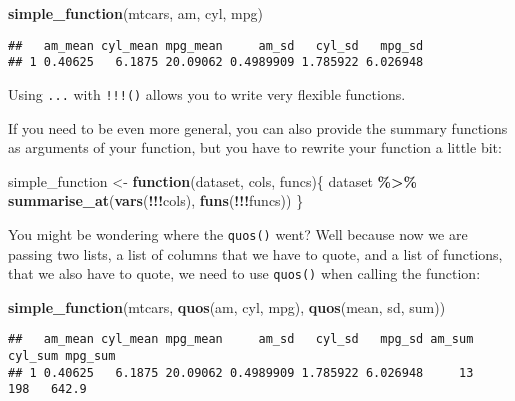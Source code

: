 \documentclass[
]{article}
\newenvironment{Shaded}{\begin{snugshade}}{\end{snugshade}}
\newcommand{\ControlFlowTok}[1]{\textcolor[rgb]{0.13,0.29,0.53}{\textbf{#1}}}
\newcommand{\KeywordTok}[1]{\textcolor[rgb]{0.13,0.29,0.53}{\textbf{#1}}}
\newcommand{\NormalTok}[1]{#1}
\newcommand{\OperatorTok}[1]{\textcolor[rgb]{0.81,0.36,0.00}{\textbf{#1}}}
\newcommand{\StringTok}[1]{\textcolor[rgb]{0.31,0.60,0.02}{#1}}
\begin{document}
\begin{Shaded}
\begin{Highlighting}[]
\KeywordTok{simple\_function}\NormalTok{(mtcars, am, cyl, mpg)}
\end{Highlighting}
\end{Shaded}

\begin{verbatim}
##   am_mean cyl_mean mpg_mean     am_sd   cyl_sd   mpg_sd
## 1 0.40625   6.1875 20.09062 0.4989909 1.785922 6.026948
\end{verbatim}

Using \texttt{...} with \texttt{!!!()} allows you to write very flexible functions.

If you need to be even more general, you can also provide the summary functions as arguments of
your function, but you have to rewrite your function a little bit:

\begin{Shaded}
\begin{Highlighting}[]
\NormalTok{simple\_function \textless{}{-}}\StringTok{ }\ControlFlowTok{function}\NormalTok{(dataset, cols, funcs)\{}
\NormalTok{  dataset }\OperatorTok{\%\textgreater{}\%}
\StringTok{    }\KeywordTok{summarise\_at}\NormalTok{(}\KeywordTok{vars}\NormalTok{(}\OperatorTok{!!!}\NormalTok{cols), }\KeywordTok{funs}\NormalTok{(}\OperatorTok{!!!}\NormalTok{funcs))}
\NormalTok{\}}
\end{Highlighting}
\end{Shaded}

You might be wondering where the \texttt{quos()} went? Well because now we are passing two lists, a list of
columns that we have to quote, and a list of functions, that we also have to quote, we need to use \texttt{quos()}
when calling the function:

\begin{Shaded}
\begin{Highlighting}[]
\KeywordTok{simple\_function}\NormalTok{(mtcars, }\KeywordTok{quos}\NormalTok{(am, cyl, mpg), }\KeywordTok{quos}\NormalTok{(mean, sd, sum))}
\end{Highlighting}
\end{Shaded}

\begin{verbatim}
##   am_mean cyl_mean mpg_mean     am_sd   cyl_sd   mpg_sd am_sum cyl_sum mpg_sum
## 1 0.40625   6.1875 20.09062 0.4989909 1.785922 6.026948     13     198   642.9
\end{verbatim}
\end{document}
